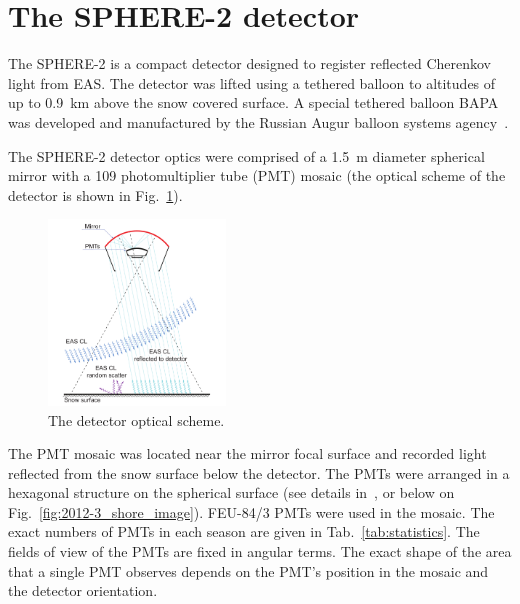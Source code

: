 \documentclass[final,5p,times,twocolumn]{elsarticle}
\begin{document}
\section{The SPHERE-2 detector \label{sect:detector}}

The \mbox{SPHERE-2} is a compact detector designed to register reflected Cherenkov light from EAS. The detector was lifted using a tethered balloon to altitudes of up to 0.9~km above the snow covered surface. A special tethered balloon BAPA~\cite{Ant20} was developed and manufactured by the Russian Augur balloon systems agency~\cite{Augur}.

The \mbox{SPHERE-2} detector optics were comprised of a 1.5~m diameter spherical mirror with a 109 photomultiplier tube (PMT) mosaic (the optical scheme of the detector is shown in Fig.~\ref{fig:optics}).

\begin{figure}[bt]
\centering
    \includegraphics[width=0.42\textwidth]{optics}
    \caption{The detector optical scheme.}
\label{fig:optics}
\end{figure}

The PMT mosaic was located near the mirror focal surface and recorded light reflected from the snow surface below the detector. The PMTs were arranged in a hexagonal structure on the spherical surface (see details in~\cite{Ant20}, or below on Fig.~\ref{fig:2012-3_shore_image}). FEU-84/3 PMTs were used in the mosaic. The exact numbers of PMTs in each season are given in Tab.~\ref{tab:statistics}. The fields of view of the PMTs are fixed in angular terms. The exact shape of the area that a single PMT observes depends on the PMT's position in the mosaic and the detector orientation.
\end{document}
